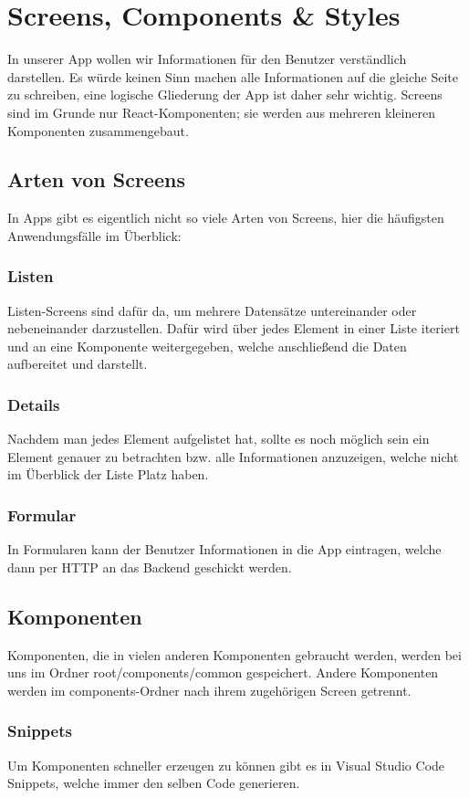 \chapter{Screens, Components \& Styles}
In unserer App wollen wir Informationen für den Benutzer verständlich darstellen. Es würde keinen
Sinn machen alle Informationen auf die gleiche Seite zu schreiben, eine logische Gliederung der App
ist daher sehr wichtig. Screens sind im Grunde nur React-Komponenten; sie werden aus mehreren
kleineren Komponenten zusammengebaut.

\section{Arten von Screens}
In Apps gibt es eigentlich nicht so viele Arten von Screens, hier die häufigsten Anwendungsfälle im
Überblick:

\subsection{Listen}
Listen-Screens sind dafür da, um mehrere Datensätze untereinander oder nebeneinander darzustellen.
Dafür wird über jedes Element in einer Liste iteriert und an eine Komponente weitergegeben, welche
anschließend die Daten aufbereitet und darstellt.

\subsection{Details}
Nachdem man jedes Element aufgelistet hat, sollte es noch möglich sein ein Element genauer zu
betrachten bzw. alle Informationen anzuzeigen, welche nicht im Überblick der Liste Platz haben.

\subsection{Formular}
In Formularen kann der Benutzer Informationen in die App eintragen, welche dann per HTTP an das
Backend geschickt werden.

\section{Komponenten}
Komponenten, die in vielen anderen Komponenten gebraucht werden, werden bei uns im Ordner
root/components/common gespeichert. Andere Komponenten werden im components-Ordner nach ihrem
zugehörigen Screen getrennt.

\subsection{Snippets}
Um Komponenten schneller erzeugen zu können gibt es in Visual Studio Code Snippets, welche immer den
selben Code generieren.

